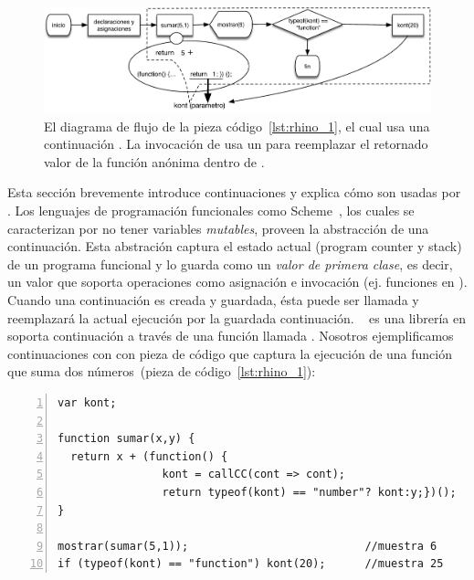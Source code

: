 \documentclass[conference]{IEEEtran}
\begin{document}
\begin{figure}[t]
\begin{center}
\includegraphics[width=.8\linewidth]{fig-kont}
\caption{El diagrama de flujo de la pieza c\'odigo~\ref{lst:rhino_1}, el cual usa una continuaci\'on . La invocaci\'on de  usa un  para reemplazar el retornado valor de la funci\'on an\'onima dentro de .}  

\label{fig:kont}
\end{center}
\end{figure}

Esta secci\'on brevemente introduce continuaciones y explica c\'omo son usadas por \deloreanjs. Los lenguajes de programaci\'on funcionales como Scheme~\cite{scheme48}, los cuales se caracterizan por no tener variables {\em mutables}, proveen la abstracci\'on de una continuaci\'on. Esta abstraci\'on captura el estado actual (program counter y stack) de un programa funcional y lo guarda como un {\em valor de primera clase}, es decir, un valor que soporta operaciones como asignaci\'on e invocaci\'on (ej. funciones en \javascript). Cuando una continuaci\'on es creada y guardada, \'esta puede ser llamada y reemplazar\'a la actual ejecuci\'on por la guardada continuaci\'on. \unwinder~\cite{unwinder:2018} es una librer\'ia en \javascript soporta continuaci\'on a trav\'es de una funci\'on llamada . Nosotros ejemplificamos continuaciones con \unwinder con pieza de c\'odigo que captura la ejecuci\'on de una funci\'on que suma dos n\'umeros~(pieza de c\'odigo~\ref{lst:rhino_1}):     


\begin{lstlisting}[linewidth=\columnwidth,numbers=left,caption=Uso de continuaciones con la librer\'ia \unwinder., label=lst:rhino_1]
var kont;

function sumar(x,y) {
  return x + (function() {
                kont = callCC(cont => cont);
                return typeof(kont) == "number"? kont:y;})();
}

mostrar(sumar(5,1));                           //muestra 6
if (typeof(kont) == "function") kont(20);      //muestra 25
\end{lstlisting}
\end{document}
